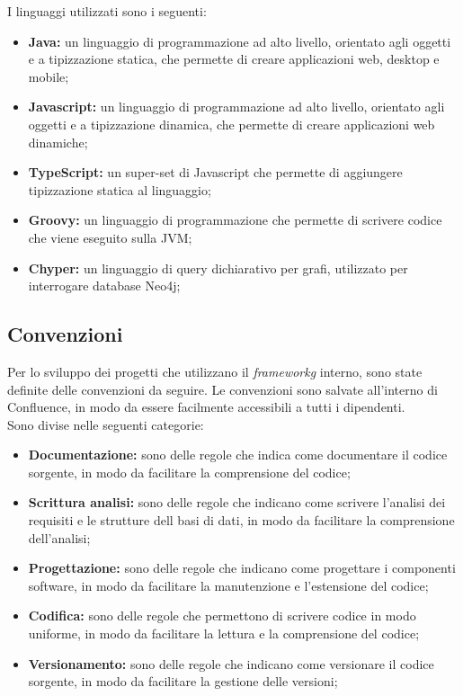 I linguaggi utilizzati sono i seguenti:\\

\begin{itemize}
  \item \textbf{Java:} un linguaggio di programmazione ad alto livello, orientato agli oggetti e a tipizzazione statica, che permette di creare applicazioni web, desktop e mobile;
  \item \textbf{Javascript:} un linguaggio di programmazione ad alto livello, orientato agli oggetti e a tipizzazione dinamica, che permette di creare applicazioni web dinamiche;
  \item \textbf{TypeScript:} un super-set di Javascript che permette di aggiungere tipizzazione statica al linguaggio;
  \item \textbf{Groovy:} un linguaggio di programmazione che permette di scrivere codice che viene eseguito sulla \gls{JVM};
  \item \textbf{Chyper:} un linguaggio di query dichiarativo per grafi, utilizzato per interrogare database \gls{Neo4j};
\end{itemize}

\subsection{Convenzioni}
Per lo sviluppo dei progetti che utilizzano il \textit{frameworkg} interno, sono state definite delle convenzioni da seguire.
Le convenzioni sono salvate all'interno di Confluence, in modo da essere facilmente accessibili a tutti i dipendenti. \\
Sono divise nelle seguenti categorie:
\begin{itemize}
  \item \textbf{Documentazione:} sono delle regole che indica come documentare il codice sorgente, in modo da facilitare la comprensione del codice;
  \item \textbf{Scrittura analisi:} sono delle regole che indicano come scrivere l'analisi dei requisiti e le strutture dell basi di dati, in modo da facilitare la comprensione dell'analisi;
  \item \textbf{Progettazione:} sono delle regole che indicano come progettare i componenti software, in modo da facilitare la manutenzione e l'estensione del codice;
  \item \textbf{Codifica:} sono delle regole che permettono di scrivere codice in modo uniforme, in modo da facilitare la lettura e la comprensione del codice;
  \item \textbf{Versionamento:} sono delle regole che indicano come versionare il codice sorgente, in modo da facilitare la gestione delle versioni;
\end{itemize}

